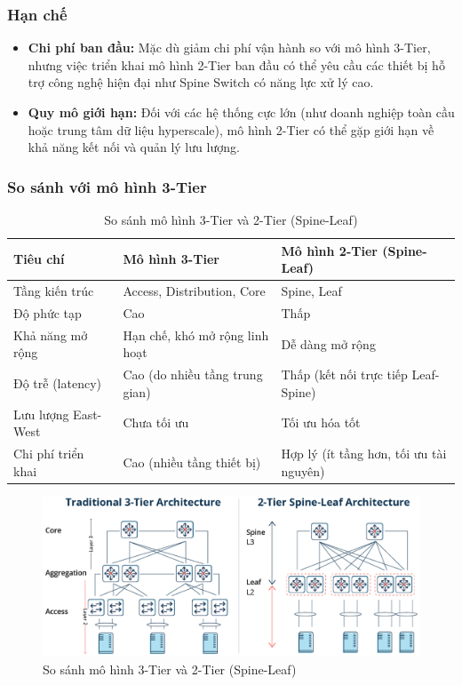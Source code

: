\documentclass[13pt]{article}
\begin{document}
\subsubsection{Hạn chế}
\begin{itemize}
    \item \textbf{Chi phí ban đầu: }Mặc dù giảm chi phí vận hành so với mô hình 3-Tier, nhưng việc triển khai mô hình 2-Tier ban đầu có thể yêu cầu các thiết bị hỗ trợ công nghệ hiện đại như Spine Switch có năng lực xử lý cao.
    \item \textbf{Quy mô giới hạn: }Đối với các hệ thống cực lớn (như doanh nghiệp toàn cầu hoặc trung tâm dữ liệu hyperscale), mô hình 2-Tier có thể gặp giới hạn về khả năng kết nối và quản lý lưu lượng.
\end{itemize}

\subsubsection{So sánh với mô hình 3-Tier}
\begin{table}[h!]
\centering
\begin{tabular}{|p{3cm}|p{5cm}|p{5cm}|}
\hline
\textbf{Tiêu chí} & \textbf{Mô hình 3-Tier} & \textbf{Mô hình 2-Tier (Spine-Leaf)} \\ 
\hline
Tầng kiến trúc & Access, Distribution, Core & Spine, Leaf \\ 
\hline
Độ phức tạp & Cao & Thấp \\ 
\hline
Khả năng mở rộng & Hạn chế, khó mở rộng linh hoạt & Dễ dàng mở rộng \\ 
\hline
Độ trễ (latency) & Cao (do nhiều tầng trung gian) & Thấp (kết nối trực tiếp Leaf-Spine) \\ 
\hline
Lưu lượng East-West & Chưa tối ưu & Tối ưu hóa tốt \\ 
\hline
Chi phí triển khai & Cao (nhiều tầng thiết bị) & Hợp lý (ít tầng hơn, tối ưu tài nguyên) \\ 
\hline
\end{tabular}
\caption{So sánh mô hình 3-Tier và 2-Tier (Spine-Leaf)}
\label{tab:comparison}
\end{table}

    \begin{figure}[h!]
        \centering
        \includegraphics[width=0.7\linewidth]{image/17.png}
            \caption{So sánh mô hình 3-Tier và 2-Tier (Spine-Leaf)}
            \label{fig:label1}
    \end{figure}
\end{document}
